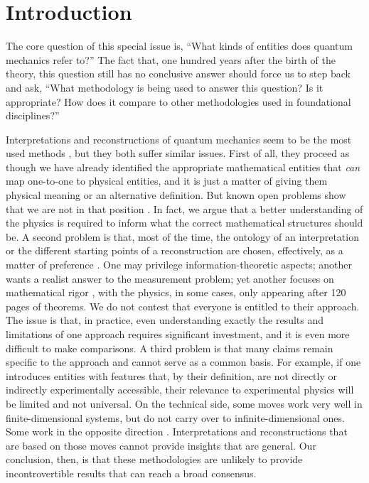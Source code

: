 \documentclass[entropy,article,submit,moreauthors]{Definitions/mdpi}
\begin{document}
\section{Introduction}

The core question of this special issue is, ``What kinds of entities does quantum mechanics refer to?'' The fact that, one hundred years after the birth of the theory, this question still has no conclusive answer \cite{SchlosshauerKoflerZeilinger2013,JedlickaEtAl2025} should force us to step back and ask, ``What methodology is being used to answer this question? Is it appropriate? How does it compare to other methodologies used in foundational disciplines?''

Interpretations and reconstructions of quantum mechanics seem to be the most used methods \cite{Myrvold2022,Grinbaum2007,Berghofer2024}, but they both suffer similar issues. First of all, they proceed as though we have already identified the appropriate mathematical entities that \emph{can} map one-to-one to physical entities, and it is just a matter of giving them physical meaning or an alternative definition. But known open problems show that we are not in that position \cite{CarcassiCalderonAidala2025,JaffeWitten2006,Gallavotti2006,Heathcote1990,Ruetsche2011,EarmanFraser2006,Redei1996,Toader2021}. In fact, we argue that a better understanding of the physics is required to inform what the correct mathematical structures should be. A second problem is that, most of the time, the ontology of an interpretation or the different starting points of a reconstruction are chosen, effectively, as a matter of preference \cite{SchlosshauerKoflerZeilinger2013,JedlickaEtAl2025,Grinbaum2007,Berghofer2024}. One may privilege information-theoretic aspects; another wants a realist answer to the measurement problem; yet another focuses on mathematical rigor \cite{Berghofer2024,AlloriEtAl2008,KronzLupher2024}, with the physics, in some cases, only appearing after 120 pages of theorems. We do not contest that everyone is entitled to their approach. The issue is that, in practice, even understanding exactly the results and limitations of one approach requires significant investment, and it is even more difficult to make comparisons. A third problem is that many claims remain specific to the approach and cannot serve as a common basis. For example, if one introduces entities with features that, by their definition, are not directly or indirectly experimentally accessible, their relevance to experimental physics will be limited and not universal. On the technical side, some moves work very well in finite-dimensional systems, but do not carry over to infinite-dimensional ones. Some work in the opposite direction \cite{Ruetsche2011}. Interpretations and reconstructions that are based on those moves cannot provide insights that are general. Our conclusion, then, is that these methodologies are unlikely to provide incontrovertible results that can reach a broad consensus.
\end{document}
